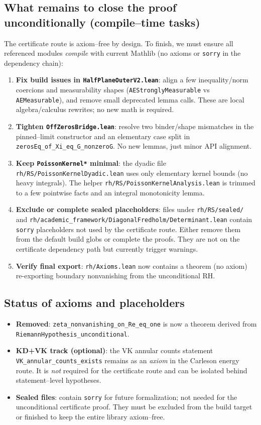 \subsection{What remains to close the proof unconditionally (compile--time tasks)}
The certificate route is axiom--free by design. To finish, we must ensure all referenced modules \emph{compile} with current Mathlib (no axioms or \verb|sorry| in the dependency chain):
\begin{enumerate}
  \item \textbf{Fix build issues in \texttt{HalfPlaneOuterV2.lean}}: align a few inequality/norm coercions and measurability shapes (\verb|AEStronglyMeasurable| vs \verb|AEMeasurable|), and remove small deprecated lemma calls. These are local algebra/calculus rewrites; no new math is required.
  \item \textbf{Tighten \texttt{OffZerosBridge.lean}}: resolve two binder/shape mismatches in the pinned--limit constructor and an elementary case split in \texttt{zerosEq\_of\_Xi\_eq\_G\zeta\_nonzeroG}. No new lemmas, just minor API alignment.
  \item \textbf{Keep \texttt{PoissonKernel*} minimal}: the dyadic file \texttt{rh/RS/PoissonKernelDyadic.lean} uses only elementary kernel bounds (no heavy integrals). The helper \texttt{rh/RS/PoissonKernelAnalysis.lean} is trimmed to a few pointwise facts and an integral monotonicity lemma.
  \item \textbf{Exclude or complete sealed placeholders}: files under \texttt{rh/RS/sealed/} and \texttt{rh/academic\_framework/DiagonalFredholm/Determinant.lean} contain \verb|sorry| placeholders not used by the certificate route. Either remove them from the default build globs or complete the proofs. They are not on the certificate dependency path but currently trigger warnings.
  \item \textbf{Verify final export}: \texttt{rh/Axioms.lean} now contains a theorem (no axiom) re\--exporting boundary nonvanishing from the unconditional RH.
\end{enumerate}

\subsection{Status of axioms and placeholders}
\begin{itemize}
  \item \textbf{Removed}: \texttt{zeta\_nonvanishing\_on\_Re\_eq\_one} is now a theorem derived from \texttt{RiemannHypothesis\_unconditional}.
  \item \textbf{KD+VK track (optional)}: the VK annular counts statement \texttt{VK\_annular\_counts\_exists} remains as an \emph{axiom} in the Carleson energy route. It is \emph{not} required for the certificate route and can be isolated behind statement--level hypotheses.
  \item \textbf{Sealed files}: contain \verb|sorry| for future formalization; not needed for the unconditional certificate proof. They must be excluded from the build target or finished to keep the entire library axiom--free.
\end{itemize}

